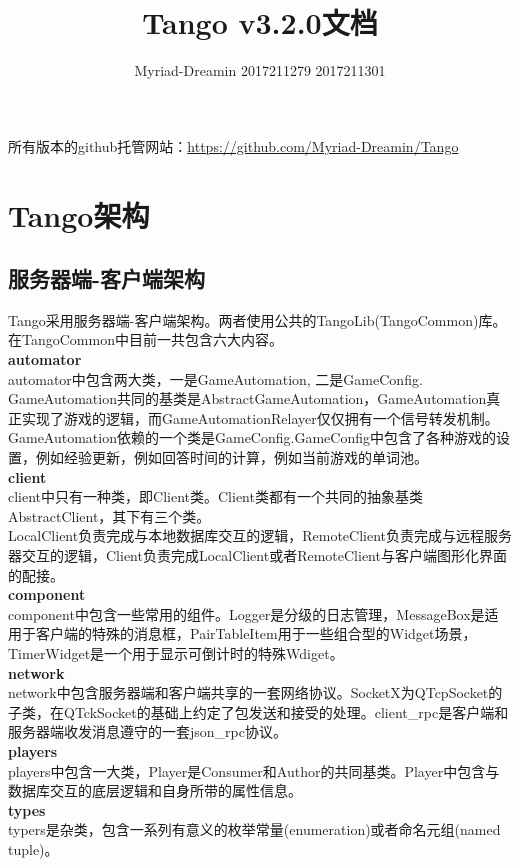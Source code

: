 \documentclass[UTF8]{ctexart}
\title{Tango v3.2.0文档}
\author{Myriad-Dreamin 2017211279 2017211301}
\date{}
\newcommand{\hfindent}{\hspace*{1em}}
\begin{document}
\setlength{\parindent}{2em}
\setlength{\baselineskip}{2.5em}
\maketitle
所有版本的github托管网站：\url{https://github.com/Myriad-Dreamin/Tango}
\section{Tango架构}
\subsection{服务器端-客户端架构}
Tango采用服务器端-客户端架构。两者使用公共的TangoLib(TangoCommon)库。
在TangoCommon中目前一共包含六大内容。\\
\hfindent\textbf{automator}\\
\indent automator中包含两大类，一是GameAutomation, 二是GameConfig.\\
\indent GameAutomation共同的基类是AbstractGameAutomation，GameAutomation真正实现了游戏的逻辑，而GameAutomationRelayer仅仅拥有一个信号转发机制。\\
\indent GameAutomation依赖的一个类是GameConfig.GameConfig中包含了各种游戏的设置，例如经验更新，例如回答时间的计算，例如当前游戏的单词池。\\
\hfindent\textbf{client}\\
\indent client中只有一种类，即Client类。Client类都有一个共同的抽象基类AbstractClient，其下有三个类。\\
\indent LocalClient负责完成与本地数据库交互的逻辑，RemoteClient负责完成与远程服务器交互的逻辑，Client负责完成LocalClient或者RemoteClient与客户端图形化界面的配接。\\
\hfindent\textbf{component}\\
\indent component中包含一些常用的组件。Logger是分级的日志管理，MessageBox是适用于客户端的特殊的消息框，PairTableItem用于一些组合型的Widget场景，TimerWidget是一个用于显示可倒计时的特殊Wdiget。\\
\hfindent\textbf{network}\\
\indent network中包含服务器端和客户端共享的一套网络协议。SocketX为QTcpSocket的子类，在QTckSocket的基础上约定了包发送和接受的处理。client\_rpc是客户端和服务器端收发消息遵守的一套json\_rpc协议。\\
\hfindent\textbf{players}\\
\indent players中包含一大类，Player是Consumer和Author的共同基类。Player中包含与数据库交互的底层逻辑和自身所带的属性信息。\\
\hfindent\textbf{types}\\
\indent typers是杂类，包含一系列有意义的枚举常量(enumeration)或者命名元组(named tuple)。\\
\end{document}
